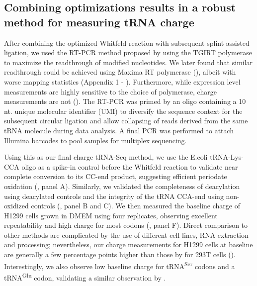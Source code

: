 \documentclass[9pt,lineno]{elife}
\begin{document}
\subsection{Combining optimizations results in a robust method for measuring tRNA charge}
After combining the optimized Whitfeld reaction with subsequent splint assisted ligation, we used the RT-PCR method proposed by \cite{Behrens2021-gb} using the TGIRT polymerase \citep{Mohr2013-hu} to maximize the readthrough of modified nucleotides.
We later found that similar readthrough could be achieved using Maxima RT polymerase (), albeit with worse mapping statistics (Appendix 1 - ).
Furthermore, while expression level measurements are highly sensitive to the choice of polymerase, charge measurements are not ().
The RT-PCR was primed by an oligo containing a 10 nt. unique molecular identifier (UMI) to diversify the sequence context for the subsequent circular ligation and allow collapsing of reads derived from the same tRNA molecule during data analysis.
A final PCR was performed to attach Illumina barcodes to pool samples for multiplex sequencing.

Using this as our final charge tRNA-Seq method, we use the E.coli tRNA-Lys-CCA oligo as a spike-in control before the Whitfeld reaction to validate near complete conversion to its CC-end product, suggesting efficient periodate oxidation (, panel A).
Similarly, we validated the completeness of deacylation using deacylated controls and the integrity of the tRNA CCA-end using non-oxidized controls (, panel B and C).
We then measured the baseline charge of H1299 cells grown in DMEM using four replicates, observing excellent repeatability and high charge for most codons (, panel F).
Direct comparison to other methods are complicated by the use of different cell lines, RNA extraction and processing; nevertheless, our charge measurements for H1299 cells at baseline are generally a few percentage points higher than those by \cite{Evans2017-st} for 293T cells ().
Interestingly, we also observe low baseline charge for tRNA\textsuperscript{Ser} codons and a tRNA\textsuperscript{Glu} codon, validating a similar observation by \cite{Evans2017-st}.
\end{document}
